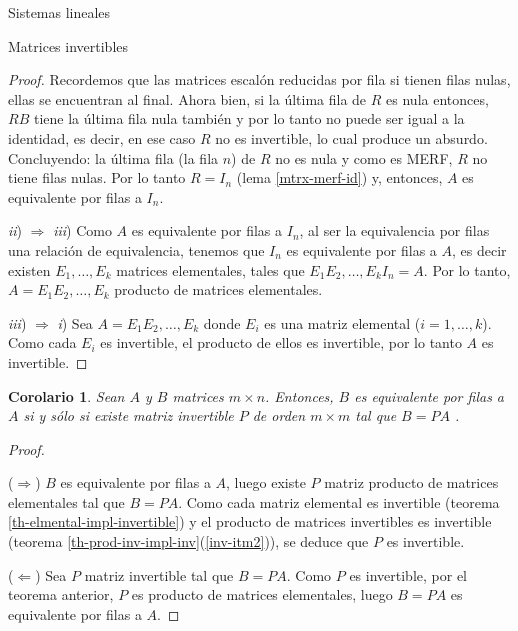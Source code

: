 \documentclass[a4paper,12pt,twoside,spanish]{amsbook}
\newtheorem{corolario}[teorema]{Corolario}
\theoremstyle{definition}
\theoremstyle{remark}
\begin{document}
\begin{chapter}{Sistemas lineales}
\begin{section}{Matrices invertibles}
\begin{proof}
				Recordemos que las matrices escalón reducidas por fila si tienen filas nulas, ellas se encuentran al final.  Ahora bien,  si la última fila de $R$ es nula entonces,  $RB$ tiene la última fila nula también y por lo tanto no puede ser igual a la identidad, es decir, en ese caso $R$ no es invertible, lo cual produce un absurdo. Concluyendo: la última fila (la fila $n$) de $R$ no es nula y como es MERF, $R$ no tiene filas nulas. Por lo tanto $R=I_n$ (lema \ref{mtrx-merf-id}) y,  entonces, $A$ es equivalente por filas a $I_n$. 
				
				\textit{ii}) $\Rightarrow$ \textit{iii}) Como $A$  es equivalente por filas a $I_n$, al ser la equivalencia por filas una relación de equivalencia,  tenemos que $I_n$ es equivalente por filas a $A$, es decir  existen $E_1,\ldots,E_k$ matrices elementales, tales que $E_1E_2,\ldots,E_kI_n = A$. Por lo tanto, $A =E_1E_2,\ldots,E_k$ producto de matrices elementales.
				
				\textit{iii}) $\Rightarrow$ \textit{i}) Sea $A = E_1E_2,\ldots,E_k$ donde $E_i$  es una matriz elemental ($i=1,\ldots,k$). Como cada $E_i$ es invertible,  el producto de ellos es invertible,  por lo tanto $A$ es invertible.
			\end{proof}	
			
			\begin{corolario}
				Sean $A$ y $B$ matrices $m \times n$. Entonces,   $B$ es equivalente por filas a $A$ si y sólo si existe matriz invertible $P$ de orden $m \times m$ tal que $B =PA$ . 
			\end{corolario}
			\begin{proof}
				
				\
				
				($\Rightarrow$) $B$ es equivalente por filas a $A$,  luego existe $P$ matriz producto de matrices elementales tal que $B =PA$. Como cada matriz elemental es invertible (teorema \ref{th-elmental-impl-invertible}) y el producto de matrices invertibles es invertible (teorema  \ref{th-prod-inv-impl-inv}(\ref{inv-itm2})), se deduce que $P$ es invertible. 
				
				($\Leftarrow$) Sea  $P$  matriz invertible tal que $B =PA$. Como $P$ es invertible, por el teorema anterior, $P$ es producto de matrices elementales, luego $B =PA$ es equivalente por filas a $A$.
			\end{proof}	
			

\end{section}
\end{chapter}
\end{document}
